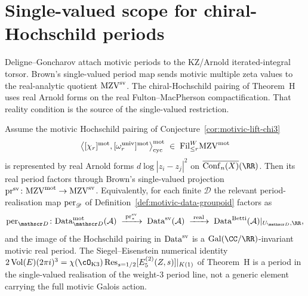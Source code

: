 \section{Single-valued scope for chiral-Hochschild periods}
\label{sec:sv-scope-restriction}

\providecommand{\zetasv}{\zeta^{\mathrm{sv}}}
\providecommand{\MZVsv}{\MZV^{\mathrm{sv}}}
\providecommand{\MZVmot}{\MZV^{\mot}}
\providecommand{\proj}{\mathrm{pr}^{\mathrm{sv}}}

Deligne--Goncharov attach motivic periods to the KZ/Arnold
iterated-integral torsor. Brown's single-valued period map sends
motivic multiple zeta values to the real-analytic quotient
$\MZVsv$. The chiral-Hochschild pairing of Theorem~H uses real Arnold
forms on the real Fulton--MacPherson compactification. That reality
condition is the source of the single-valued restriction.

\begin{theorem}
Assume the motivic Hochschild pairing of
Conjecture~\ref{cor:motivic-lift-chi3}
\[
 \bigl\langle [\chi_r]^{\mot},
 [\omega_r^{\mathrm{univ}}]^{\mot}\bigr\rangle_{\mathrm{cyc}}^{\mot}
 \;\in\; \Fil^W_{\le r}\MZVmot
\]
is represented by real Arnold forms
$d\log|z_i-z_j|^2$ on
$\overline{\mathrm{Conf}_n(X)}(\RR)$. Then its real period factors
through Brown's single-valued projection
$\proj\colon \MZVmot\to\MZVsv$. Equivalently, for each finite
$\mathscr D$ the relevant period-realisation map
$\mathrm{per}_{\mathscr D}$ of Definition~\ref{def:motivic-data-groupoid}
factors as
\[
 \per_{\mathscr D}\colon
 \Data^{\mot}_{\mathscr D}(\cA)\;\xrightarrow{\;\proj_*\;}\;
 \Data^{\mathrm{sv}}(\cA)\;\xrightarrow{\;\mathrm{real}\;}\;
 \Data^{\BettiRlz}(\cA)|_{U_{\mathscr D},\RR},
\]
and the image of the Hochschild pairing in
$\mathrm{Data}^{\mathrm{sv}}$ is a $\mathrm{Gal}(\CC/\RR)$-invariant
motivic real period. The Siegel--Eisenstein numerical identity
$2\,\mathrm{Vol}(E)(2\pi i)^3 = \chi(\cO_{\mathrm{K3}})
\Res_{s=1/2}[E_5^{(2)}(Z,s)]|_{K(1)}$ of Theorem~H is a period
in the single-valued realisation of the weight-$3$ period line, not a
generic element carrying the full motivic Galois action.
\end{theorem}


